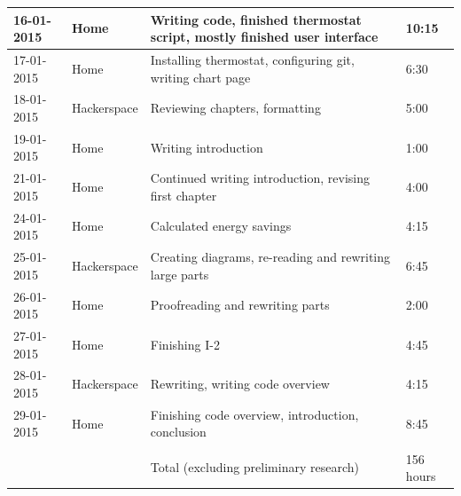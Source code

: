 \documentclass[12pt,a4paper,final]{report}
\begin{document}
\begin{longtable}{ | p{2.5cm} | p{2.5cm} | p{5cm} | p{2cm} |}
	\hline
	16-01-2015 & Home & Writing code, finished thermostat script, mostly finished user interface & 10:15 \\
	\hline
	17-01-2015 & Home & Installing thermostat, configuring git, writing chart page & 6:30 \\
	\hline
	18-01-2015 & Hackerspace & Reviewing chapters, formatting & 5:00 \\
	\hline
	19-01-2015 & Home & Writing introduction & 1:00 \\
	\hline
	21-01-2015 & Home & Continued writing introduction, revising first chapter & 4:00 \\
	\hline
	24-01-2015 & Home & Calculated energy savings & 4:15 \\
	\hline
	25-01-2015 & Hackerspace & Creating diagrams, re-reading and rewriting large parts & 6:45 \\
	\hline
	26-01-2015 & Home & Proofreading and rewriting parts & 2:00 \\
	\hline
	27-01-2015 & Home & Finishing I-2 & 4:45\\
	\hline
	28-01-2015 & Hackerspace & Rewriting, writing code overview & 4:15 \\
	\hline
	29-01-2015 & Home & Finishing code overview, introduction, conclusion & 8:45 \\
	\hline 
	& & & \\
	\hline
	& & Total (excluding preliminary research) & 156 hours \\
	\hline
    \end{longtable}
\endgroup

\listoffigures
\listoftables
\end{document}
